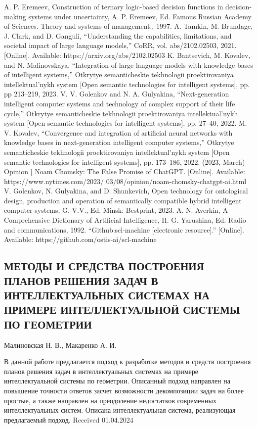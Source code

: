 \documentclass[10pt,a4paper,twocolumn]{article}
\begin{document}
\begin{thebibliography}{196}
{\bibitem  A. P. Eremeev, Construction of ternary logic-based decision
functions in decision-making systems under uncertainty, A. P.
Eremeev, Ed. Famous Russian Academy of Sciences. Theory
and systems of management., 1997.
\bibitem  A. Tamkin, M. Brundage, J. Clark, and D. Ganguli,
“Understanding the capabilities, limitations, and societal impact
of large language models,” CoRR, vol. abs/2102.02503, 2021.
[Online]. Available: https://arxiv.org/abs/2102.02503
\bibitem  K. Bantsevich, M. Kovalev, and N. Malinovskaya, “Integration
of large language models with knowledge bases of intelligent
systems,” Otkrytye semanticheskie tekhnologii proektirovaniya intellektual’nykh system [Open semantic technologies for intelligent
systems], pp. pp 213–219, 2023.
\bibitem V. V. Golenkov and N. A. Gulyakina, “Next-generation intelligent
computer systems and technology of complex support of their
life cycle,” Otkrytye semanticheskie tekhnologii proektirovaniya
intellektual’nykh system [Open semantic technologies for intelligent systems], pp. 27–40, 2022.
\bibitem  M. V. Kovalev, “Convergence and integration of artificial neural
networks with knowledge bases in next-generation intelligent
computer systems,” Otkrytye semanticheskie tekhnologii proektirovaniya intellektual’nykh system [Open semantic technologies
for intelligent systems], pp. 173–186, 2022.
\bibitem (2023, March) Opinion | Noam Chomsky: The False Promise of
ChatGPT. [Online]. Available: https://www.nytimes.com/2023/
03/08/opinion/noam-chomsky-chatgpt-ai.html
\bibitem  V. Golenkov, N. Gulyakina, and D. Shunkevich, Open technology
for ontological design, production and operation of semantically
compatible hybrid intelligent computer systems, G. V.V., Ed.
Minsk: Bestprint, 2023.
\bibitem  A. N. Averkin, A Comprehensive Dictionary of Artificial
Intelligence, H. G. Yarushina, Ed. Radio and communications,
1992.
\bibitem “Github:scl-machine [electronic resource].” [Online]. Available:
https://github.com/ostis-ai/scl-machine
}
\end{thebibliography}
\begin{center}
\subsection*{МЕТОДЫ И СРЕДСТВА ПОСТРОЕНИЯ
ПЛАНОВ РЕШЕНИЯ ЗАДАЧ В
ИНТЕЛЛЕКТУАЛЬНЫХ СИСТЕМАХ
НА ПРИМЕРЕ ИНТЕЛЛЕКТУАЛЬНОЙ
СИСТЕМЫ ПО ГЕОМЕТРИИ}
\end{center}
\Large{Малиновская Н. В., Макаренко А. И.}
\vspace{0.4cm}
\normalsize{
\par В данной работе предлагается подход к разработке
методов и средств построения планов решения задач
в интеллектуальных системах на примере интеллектуальной системы по геометрии. Описанный подход
направлен на повышение точности ответов засчет
возможности декомпозиции задач на более простые,
а также направлен на преодоление недостатков современных интеллектуальных систем. Описана интеллектуальная система, реализующая предлагаемый подход.
\vspace{1.5cm} \hspace{5cm} Received 01.04.2024
}
\end{document}
